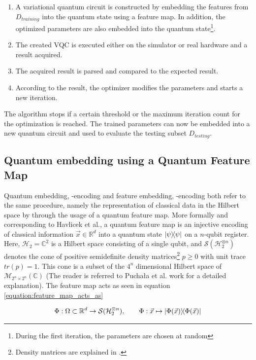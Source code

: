 \begin{enumerate}
    \item A variational quantum circuit is constructed by embedding the features from $D_{training}$ into the quantum state using a feature map. In addition, the optimized parameters are also embedded into the quantum state\footnote{During the first iteration, the parameters are chosen at random}.
    \item The created VQC is executed either on the simulator or real hardware and a result acquired.
    \item The acquired result is parsed and compared to the expected result.
    \item According to the result, the optimizer modifies the parameters and starts a new iteration.
\end{enumerate}

The algorithm stops if a certain threshold or the maximum iteration count for the optimization is reached. The trained parameters can now be embedded into a new quantum circuit and used to evaluate the testing subset $D_{testing}$.

\subsection{Quantum embedding using a Quantum Feature Map}
\label{subsection:quantum_embedding_using_a_feature_map}
Quantum embedding, -encoding and feature embedding, -encoding both refer to the same procedure, namely the representation of classical data in the Hilbert space by through the usage of a quantum feature map. 
More formally and corresponding to Havlicek et al.\cite{havlicekSupervisedLearningQuantum2019}, a quantum feature map is an injective encoding of classical information $\vec{x} \in \mathbb{R}^d$ into a quantum state $\op{\psi}{\psi}$ on a $n$-qubit register. Here, $\mathcal{H}_2 = \mathbb{C}^2$ is a Hilbert space consisting of a single qubit, and $\mathcal{S}(\mathcal{H}_2^{\otimes n})$ denotes the cone of positive semidefinite density matrices\footnote{Density matrices are explained in \cite{homeister2008quantum}.} $p \geq 0$ with unit trace $tr(p) = 1$. This cone is a subset of the $4^n$ dimensional Hilbert space of $\mathcal{M}_{2^n\times2^n}(\mathbb{C})$ (The reader is referred to Puchała et al.\cite{PuchałaStrategiesQuantumMeasurements} work for a detailed explanation). The feature map acts as seen in equation \ref{equation:feature_map_acts_as}

\begin{equation}
    \centering
    \begin{split}
        \Phi : \Omega \subset \mathbb{R}^d \rightarrow \mathcal{S}(\mathcal{H}_2^{\otimes n}), \qquad \Phi : \vec{x} \mapsto \op{\Phi(\vec{x})}{\Phi(\vec{x})}
    \end{split}
    \label{equation:feature_map_acts_as}
\end{equation}

